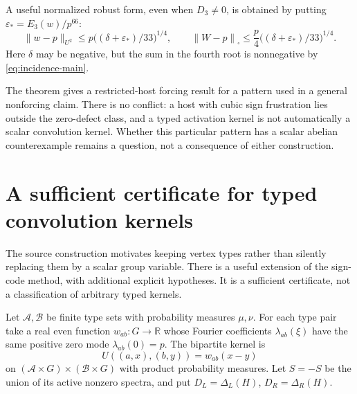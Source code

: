 \documentclass[11pt]{article}
\numberwithin{equation}{section}
\theoremstyle{definition}
\theoremstyle{remark}
\newcommand{\R}{\mathbb R}
\newcommand{\Cut}[1]{\left\|#1\right\|_{\square}}
\newcommand{\eps}{\varepsilon}
\begin{document}
A useful normalized robust form, even when $D_3\ne0$, is obtained by
putting $\eps_*=E_3(w)/p^{66}$:
\begin{equation}
 \|w-p\|_{U^2}\leq p\bigl((\delta+\eps_*)/33\bigr)^{1/4},
 \qquad
 \Cut{W-p}\leq\frac p4
       \bigl((\delta+\eps_*)/33\bigr)^{1/4}.
 \label{eq:incidence-robust-force}
\end{equation}
Here $\delta$ may be negative, but the sum in the fourth root is
nonnegative by \eqref{eq:incidence-main}.

The theorem gives a restricted-host forcing result for a pattern used
in a general nonforcing claim. There is no conflict: a host with cubic
sign frustration lies outside the zero-defect class, and a typed
activation kernel is not automatically a scalar convolution kernel.
Whether this particular pattern has a scalar abelian counterexample
remains a question, not a consequence of either construction.

\section{A sufficient certificate for typed convolution kernels}
\label{sec:typed}

The source construction motivates keeping vertex types rather than
silently replacing them by a scalar group variable. There is a useful
extension of the sign-code method, with additional explicit hypotheses.
It is a sufficient certificate, not a classification of arbitrary typed
kernels.

Let $\mathcal A,\mathcal B$ be finite type sets with probability measures
$\mu,\nu$. For each type pair take a real even function $w_{ab}:G\to\R$
whose Fourier coefficients $\lambda_{ab}(\xi)$ have the same positive
zero mode $\lambda_{ab}(0)=p$. The bipartite kernel is
\begin{equation}
 U((a,x),(b,y))=w_{ab}(x-y)
 \label{eq:typed-kernel}
\end{equation}
on $(\mathcal A\times G)\times(\mathcal B\times G)$ with product
probability measures. Let $S=-S$ be the union of its active nonzero
spectra, and put $D_L=\Delta_L(H)$, $D_R=\Delta_R(H)$.
\end{document}
